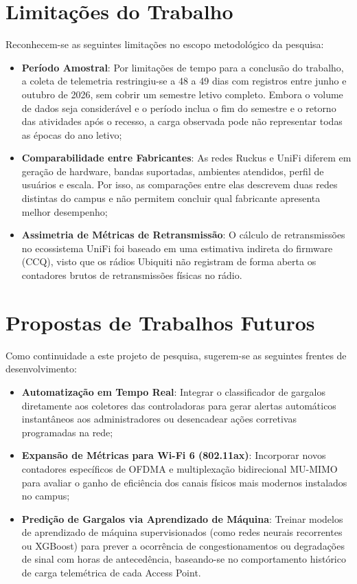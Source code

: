 \section{Limitações do Trabalho}
\label{sec:conclusao_limitacoes}

Reconhecem-se as seguintes limitações no escopo metodológico da pesquisa:
\begin{itemize}
	\item \textbf{Período Amostral}: Por limitações de tempo para a conclusão do trabalho, a coleta de telemetria restringiu-se a 48 a 49 dias com registros entre junho e outubro de 2026, sem cobrir um semestre letivo completo. Embora o volume de dados seja considerável e o período inclua o fim do semestre e o retorno das atividades após o recesso, a carga observada pode não representar todas as épocas do ano letivo;
	\item \textbf{Comparabilidade entre Fabricantes}: As redes Ruckus e UniFi diferem em geração de hardware, bandas suportadas, ambientes atendidos, perfil de usuários e escala. Por isso, as comparações entre elas descrevem duas redes distintas do campus e não permitem concluir qual fabricante apresenta melhor desempenho;
	\item \textbf{Assimetria de Métricas de Retransmissão}: O cálculo de retransmissões no ecossistema UniFi foi baseado em uma estimativa indireta do firmware (CCQ), visto que os rádios Ubiquiti não registram de forma aberta os contadores brutos de retransmissões físicas no rádio.
\end{itemize}

\section{Propostas de Trabalhos Futuros}
\label{sec:conclusao_futuros}

Como continuidade a este projeto de pesquisa, sugerem-se as seguintes frentes de desenvolvimento:
\begin{itemize}
	\item \textbf{Automatização em Tempo Real}: Integrar o classificador de gargalos diretamente aos coletores das controladoras para gerar alertas automáticos instantâneos aos administradores ou desencadear ações corretivas programadas na rede;
	\item \textbf{Expansão de Métricas para Wi-Fi 6 (802.11ax)}: Incorporar novos contadores específicos de OFDMA e multiplexação bidirecional MU-MIMO para avaliar o ganho de eficiência dos canais físicos mais modernos instalados no campus;
	\item \textbf{Predição de Gargalos via Aprendizado de Máquina}: Treinar modelos de aprendizado de máquina supervisionados (como redes neurais recorrentes ou XGBoost) para prever a ocorrência de congestionamentos ou degradações de sinal com horas de antecedência, baseando-se no comportamento histórico de carga telemétrica de cada Access Point.
\end{itemize}
